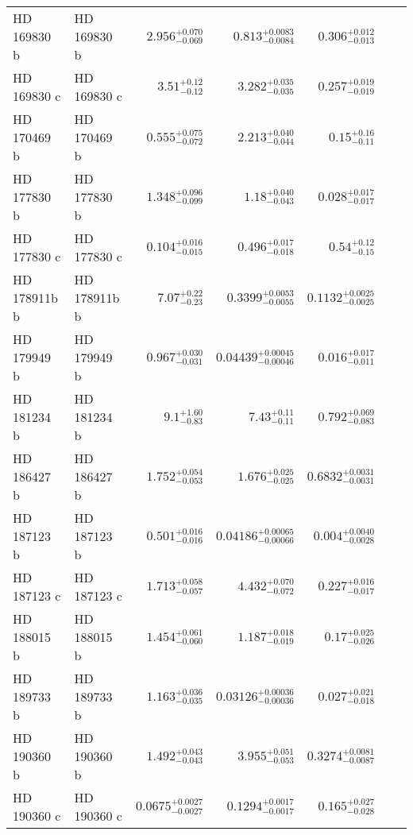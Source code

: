 \begin{longtable*}{llrrrrr}
HD 169830 b & HD 169830 b & $2.956^{+0.070}_{-0.069}$ & $0.813^{+0.0083}_{-0.0084}$ & $0.306^{+0.012}_{-0.013}$ & \cite{Naef01} & \\ 
HD 169830 c & HD 169830 c & $3.51^{+0.12}_{-0.12}$ & $3.282^{+0.035}_{-0.035}$ & $0.257^{+0.019}_{-0.019}$ & \cite{Mayor04} & \\ 
HD 170469 b & HD 170469 b & $0.555^{+0.075}_{-0.072}$ & $2.213^{+0.040}_{-0.044}$ & $0.15^{+0.16}_{-0.11}$ & \cite{Fischer07} & \\ 
HD 177830 b & HD 177830 b & $1.348^{+0.096}_{-0.099}$ & $1.18^{+0.040}_{-0.043}$ & $0.028^{+0.017}_{-0.017}$ & \cite{Butler06} & \\ 
HD 177830 c & HD 177830 c & $0.104^{+0.016}_{-0.015}$ & $0.496^{+0.017}_{-0.018}$ & $0.54^{+0.12}_{-0.15}$ & \cite{Meschiari11} & \\ 
HD 178911b b & HD 178911b b & $7.07^{+0.22}_{-0.23}$ & $0.3399^{+0.0053}_{-0.0055}$ & $0.1132^{+0.0025}_{-0.0025}$ & \cite{Zucker02} & \\ 
HD 179949 b & HD 179949 b & $0.967^{+0.030}_{-0.031}$ & $0.04439^{+0.00045}_{-0.00046}$ & $0.016^{+0.017}_{-0.011}$ & \cite{Tiney01} & \\ 
HD 181234 b & HD 181234 b & $9.1^{+1.60}_{-0.83}$ & $7.43^{+0.11}_{-0.11}$ & $0.792^{+0.069}_{-0.083}$ & \cite{Rickman19} & \\ 
HD 186427 b & HD 186427 b & $1.752^{+0.054}_{-0.053}$ & $1.676^{+0.025}_{-0.025}$ & $0.6832^{+0.0031}_{-0.0031}$ & \cite{Chochran97} & \\ 
HD 187123 b & HD 187123 b & $0.501^{+0.016}_{-0.016}$ & $0.04186^{+0.00065}_{-0.00066}$ & $0.004^{+0.0040}_{-0.0028}$ & \cite{Vogt00} & \\ 
HD 187123 c & HD 187123 c & $1.713^{+0.058}_{-0.057}$ & $4.432^{+0.070}_{-0.072}$ & $0.227^{+0.016}_{-0.017}$ & \cite{Wright09} & \\ 
HD 188015 b & HD 188015 b & $1.454^{+0.061}_{-0.060}$ & $1.187^{+0.018}_{-0.019}$ & $0.17^{+0.025}_{-0.026}$ & \cite{Marcy05} & \\ 
HD 189733 b & HD 189733 b & $1.163^{+0.036}_{-0.035}$ & $0.03126^{+0.00036}_{-0.00036}$ & $0.027^{+0.021}_{-0.018}$ & \cite{Bouchy05} & \\ 
HD 190360 b & HD 190360 b & $1.492^{+0.043}_{-0.043}$ & $3.955^{+0.051}_{-0.053}$ & $0.3274^{+0.0081}_{-0.0087}$ & \cite{Naef03} & \\ 
HD 190360 c & HD 190360 c & $0.0675^{+0.0027}_{-0.0027}$ & $0.1294^{+0.0017}_{-0.0017}$ & $0.165^{+0.027}_{-0.028}$ & \cite{Vogt05} & \\ 

\end{longtable*}

